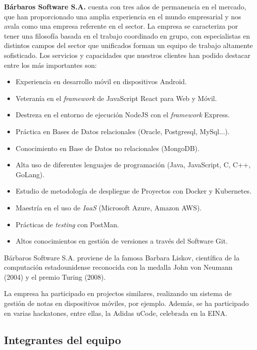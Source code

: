 \documentclass{article}
\begin{document}
\textbf{Bárbaros Software S.A.} cuenta con tres años de permanencia en el mercado, que han proporcionado una amplia experiencia en el mundo empresarial y nos avala como una empresa referente en el sector. La empresa se caracteriza por tener una filosofía basada en el trabajo coordinado en grupo, con especialistas en distintos campos del sector que unificados forman un equipo de trabajo altamente sofisticado.
Los servicios y capacidades que nuestros clientes han podido destacar entre los más importantes son:
\begin{itemize}
    \setlength\itemsep{0em}
    \item Experiencia en desarrollo móvil en dispositivos Android.
    \item Veteranía en el \textit{framework} de JavaScript React para Web y Móvil.
    \item Destreza en el entorno de ejecución NodeJS con el \textit{framework} Express.
    \item Práctica en Bases de Datos relacionales (Oracle, Postgresql, MySql...).
    \item Conocimiento en Base de Datos no relacionales (MongoDB).
    \item Alta uso de diferentes lenguajes de programación (Java, JavaScript, C, C++, GoLang).
    \item Estudio de metodología de despliegue de Proyectos con Docker y Kubernetes.
    \item Maestría en el uso de \textit{IaaS} (Microsoft Azure, Amazon AWS).
    \item Prácticas de \textit{testing} con PostMan.
    \item Altos conocimientos en gestión de versiones a través del Software Git.
\end{itemize}

Bárbaros Software S.A. proviene de la famosa Barbara Liskov, científica de la computación estadounidense reconocida con la medalla John von Neumann (2004) y el premio Turing (2008).

La empresa ha participado en projectos similares, realizando un sistema de gestión de notas en dispositivos móviles, por ejemplo. Además, se ha participado en varias hackatones, entre ellas, la Adidas uCode, celebrada en la EINA. 


\pagebreak

\subsection*{Integrantes del equipo}
\end{document}
